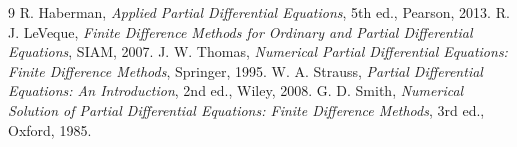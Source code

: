 \documentclass[11pt, a4paper]{article}
\begin{document}
\begin{thebibliography}{9}
    R. Haberman, \textit{Applied Partial Differential Equations}, 5th ed., Pearson, 2013.
    R. J. LeVeque, \textit{Finite Difference Methods for Ordinary and Partial Differential Equations}, SIAM, 2007.
    J. W. Thomas, \textit{Numerical Partial Differential Equations: Finite Difference Methods}, Springer, 1995.
    W. A. Strauss, \textit{Partial Differential Equations: An Introduction}, 2nd ed., Wiley, 2008.
    G. D. Smith, \textit{Numerical Solution of Partial Differential Equations: Finite Difference Methods}, 3rd ed., Oxford, 1985.
\end{thebibliography}
\end{document}
